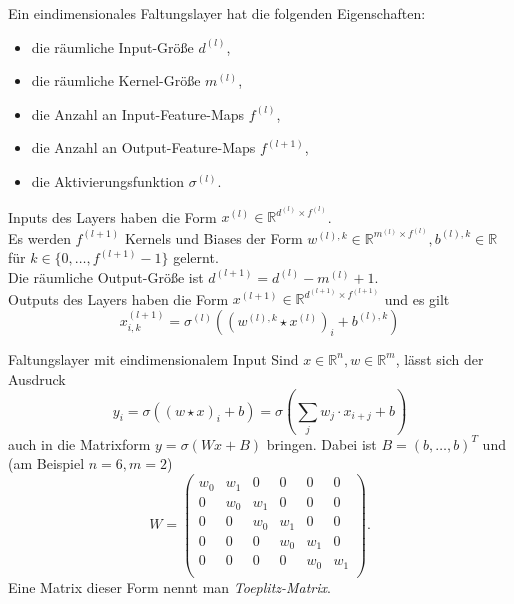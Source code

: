 \documentclass[envcountsect, smaller, aspectratio=149]{beamer}
\newcommand{\R}{\mathbb{R}}
\begin{document}
\begin{frame}
    \begin{definition}
        Ein eindimensionales Faltungslayer hat die folgenden Eigenschaften:
        \begin{itemize}
            \item die räumliche Input-Größe $d^{(l)}$,
            \item die räumliche Kernel-Größe $m^{(l)}$,
            \item die Anzahl an Input-Feature-Maps $f^{(l)}$,
            \item die Anzahl an Output-Feature-Maps $f^{(l+1)}$,
            \item die Aktivierungsfunktion $\sigma^{(l)}$.
        \end{itemize}

        \pause Inputs des Layers haben die Form $x^{(l)}\in\R^{d^{(l)} \times f^{(l)}}$.\\[.4em]

        \pause Es werden $f^{(l+1)}$ Kernels und Biases der Form $w^{(l),k}\in\R^{m^{(l)} \times f^{(l)}}, b^{(l),k}\in\R$ für  $k\in\{0,\dots, f^{(l+1)}-1\}$ gelernt.\\[.4em]

        \pause Die räumliche Output-Größe ist $d^{(l+1)} = d^{(l)}-  m^{(l)} + 1$.\\[.4em]

        \pause Outputs des Layers haben die Form $x^{(l+1)}\in \R^{d^{(l+1)}\times f^{(l+1)}}$ und es gilt
        \[
            x^{(l+1)}_{i,k} =  \sigma^{(l)}\left( (w^{(l),k} \star x^{(l)})_{i} + b^{(l),k} \right)
        \]
    \end{definition}
\end{frame}

\begin{frame}{Faltungslayer mit eindimensionalem Input}
    Sind $x\in\R^n, w\in\R^m$, lässt sich der Ausdruck  \[
        y_i = \sigma( (w \star x)_i + b ) = \sigma\left( \sum_j w_j \cdot x_{i+j} + b \right)
    \]
    auch in die Matrixform $y = \sigma(Wx + B)$ bringen.
    Dabei ist $B=(b,\dots,b)^T$ und (am Beispiel $n=6,m=2$)
    \[
        W = \left(
      \begin{array}{cccccccccc}
        w_0 & w_1 & 0 & 0 & 0 & 0  \\
        0 & w_0 & w_1 & 0 & 0 & 0  \\
        0 & 0 & w_0 & w_1 & 0 & 0  \\
        0 & 0 & 0 & w_0 & w_1 & 0  \\
        0 & 0 & 0 & 0 & w_0 & w_1  \\
      \end{array} \right) .
    \]
    Eine Matrix dieser Form nennt man \emph{Toeplitz-Matrix}.
\end{frame}
\end{document}
